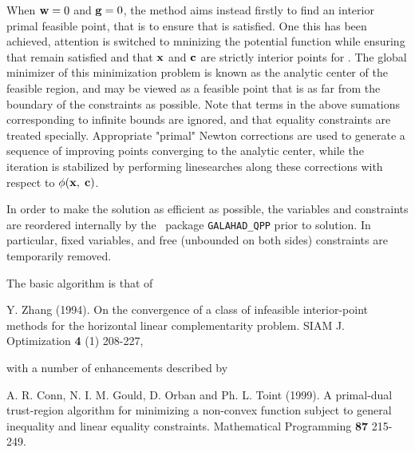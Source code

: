 \documentclass{galahad}
\begin{document}
When ${\mathbf{w}} = 0$ and ${\mathbf{g}} = 0$, the method aims instead firstly to find an 
interior primal feasible point, that is to ensure that  is satisfied. 
One this has been achieved, attention is switched to mninizing the
potential function
while ensuring that  remain satisfied and that 
${\mathbf{x}}$ and ${\mathbf{c}}$ are strictly interior points for . 
The global minimizer of this minimization problem is known as the
analytic center of the feasible region, and may be viewed as
a feasible point that is as far from the boundary of the constraints as 
possible.
Note that terms in the above sumations corresponding to infinite bounds are
ignored, and that equality constraints are treated specially.
Appropriate "primal" Newton corrections are used to generate a sequence
of improving points converging to the analytic center, while the iteration
is stabilized by performing linesearches along these corrections with respect 
to $\phi ({\mathbf{x}},\;{\mathbf{c}})$.

In order to make the solution as efficient as possible, the 
variables and constraints are reordered internally
by the \galahad\ package {\tt GALAHAD\_QPP} prior to solution. 
In particular, fixed variables, and 
free (unbounded on both sides) constraints are temporarily removed.
\vspace*{1mm}

\galreferences
\vspace*{1mm}

\noindent
The basic algorithm is that of
\vspace*{1mm}

\noindent
Y. Zhang (1994).
On the convergence of a class of infeasible interior-point methods for the
horizontal linear complementarity problem.
SIAM J. Optimization {\bf 4} (1) 208-227,
\vspace*{1mm}

\noindent
with a number of enhancements described by
\vspace*{1mm}

\noindent
A. R. Conn, N. I. M. Gould, D. Orban and Ph. L. Toint (1999).
A primal-dual trust-region algorithm for minimizing a non-convex 
function subject to general inequality and linear equality constraints.
Mathematical Programming {\bf 87} 215-249.

\end{document}
